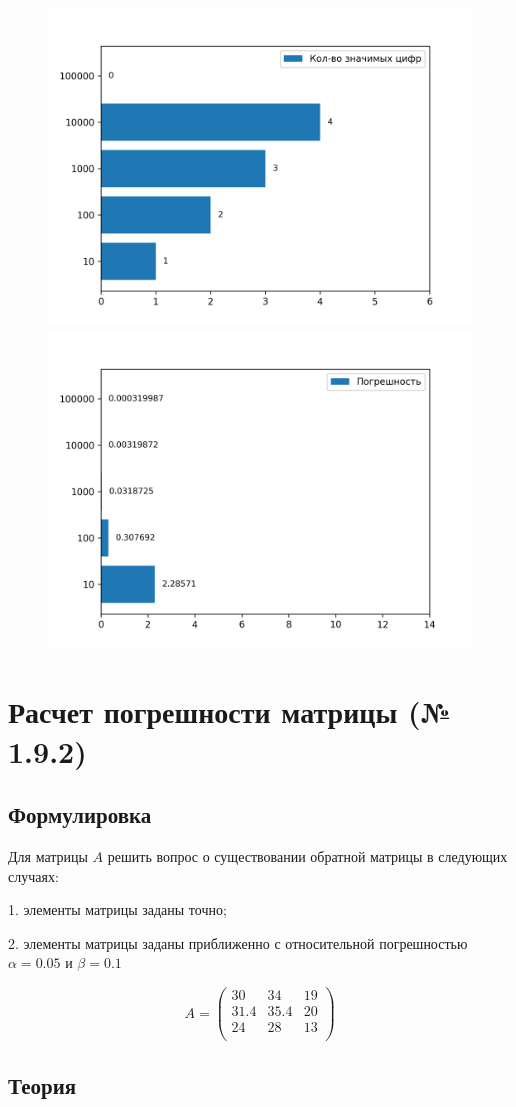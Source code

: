 \documentclass[a4paper,11pt]{article}
\theoremstyle{definition} %
\theoremstyle{remark} %
\begin{document}
\begin{figure}[h]
    \includegraphics[width=0.5\linewidth]{../../calculate_sum/digits}
    \includegraphics[width=0.5\linewidth]{../../calculate_sum/errors}
\end{figure}

\section{Расчет погрешности матрицы (№ 1.9.2)}

\subsection{Формулировка}

Для матрицы $A$ решить вопрос о существовании обратной матрицы в следующих случаях:

1. элементы матрицы заданы точно;

2. элементы матрицы заданы приближенно с относительной погрешностью $\alpha = 0.05$ и $\beta = 0.1$

$$
A =
\begin{pmatrix}
    30 & 34 & 19 \\
    31.4 & 35.4 & 20 \\
    24 & 28 & 13 \\
\end{pmatrix}
$$

\subsection{Теория}
\end{document}
